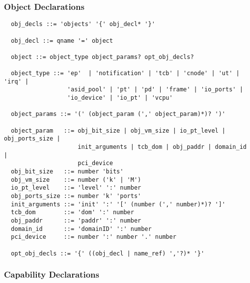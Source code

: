 \documentclass[a4paper,12pt]{article}
\begin{document}
\subsubsection{Object Declarations}

\begin{verbatim}
  obj_decls ::= 'objects' '{' obj_decl* '}'

  obj_decl ::= qname '=' object

  object ::= object_type object_params? opt_obj_decls?

  object_type ::= 'ep'  | 'notification' | 'tcb' | 'cnode' | 'ut' | 'irq' |
                  'asid_pool' | 'pt' | 'pd' | 'frame' | 'io_ports' |
                  'io_device' | 'io_pt' | 'vcpu'

  object_params ::= '(' (object_param (',' object_param)*)? ')'

  object_param   ::= obj_bit_size | obj_vm_size | io_pt_level | obj_ports_size |
                     init_arguments | tcb_dom | obj_paddr | domain_id |
                     pci_device
  obj_bit_size   ::= number 'bits'
  obj_vm_size    ::= number ('k' | 'M')
  io_pt_level    ::= 'level' ':' number
  obj_ports_size ::= number 'k' 'ports'
  init_arguments ::= 'init' ':' '[' (number (',' number)*)? ']'
  tcb_dom        ::= 'dom' ':' number
  obj_paddr      ::= 'paddr' ':' number
  domain_id      ::= 'domainID' ':' number
  pci_device     ::= number ':' number '.' number

  opt_obj_decls ::= '{' ((obj_decl | name_ref) ','?)* '}'
\end{verbatim}


\subsubsection{Capability Declarations}
\end{document}
